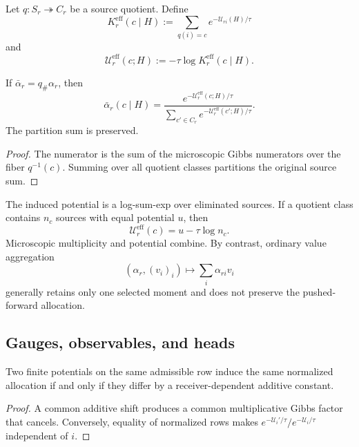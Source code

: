 Let $q:S_r\twoheadrightarrow C_r$ be a source quotient. Define
\begin{equation}\label{eq:coarse-kernel}
K_r^{\mathrm{eff}}(c\mid H)
:=\sum_{q(i)=c}e^{-\mathcal U_{ri}(H)/\tau}
\end{equation}
and
\begin{equation}\label{eq:coarse-potential}
\mathcal U_r^{\mathrm{eff}}(c;H)
:=-\tau\log K_r^{\mathrm{eff}}(c\mid H).
\end{equation}

\begin{theorem}\label{thm:potential-of-mean-force}
If $\bar\alpha_r=q_\#\alpha_r$, then
\[
\boxed{
\bar\alpha_r(c\mid H)
=
\frac{e^{-\mathcal U_r^{\mathrm{eff}}(c;H)/\tau}}
{\sum_{c'\in C_r}e^{-\mathcal U_r^{\mathrm{eff}}(c';H)/\tau}}.
}
\]
The partition sum is preserved.
\end{theorem}

\begin{proof}
The numerator is the sum of the microscopic Gibbs numerators over the fiber $q^{-1}(c)$. Summing over all quotient classes partitions the original source sum.
\end{proof}

The induced potential is a log-sum-exp over eliminated sources. If a quotient class contains $n_c$ sources with equal potential $u$, then
\[
\mathcal U_r^{\mathrm{eff}}(c)=u-\tau\log n_c.
\]
Microscopic multiplicity and potential combine. By contrast, ordinary value aggregation
\[
(\alpha_r,(v_i)_i)\longmapsto\sum_i\alpha_{ri}v_i
\]
generally retains only one selected moment and does not preserve the pushed-forward allocation.

\subsection{Gauges, observables, and heads}

\begin{proposition}\label{prop:potential-gauge}
Two finite potentials on the same admissible row induce the same normalized allocation if and only if they differ by a receiver-dependent additive constant.
\end{proposition}

\begin{proof}
A common additive shift produces a common multiplicative Gibbs factor that cancels. Conversely, equality of normalized rows makes $e^{-\mathcal U_i'/\tau}/e^{-\mathcal U_i/\tau}$ independent of $i$.
\end{proof}

